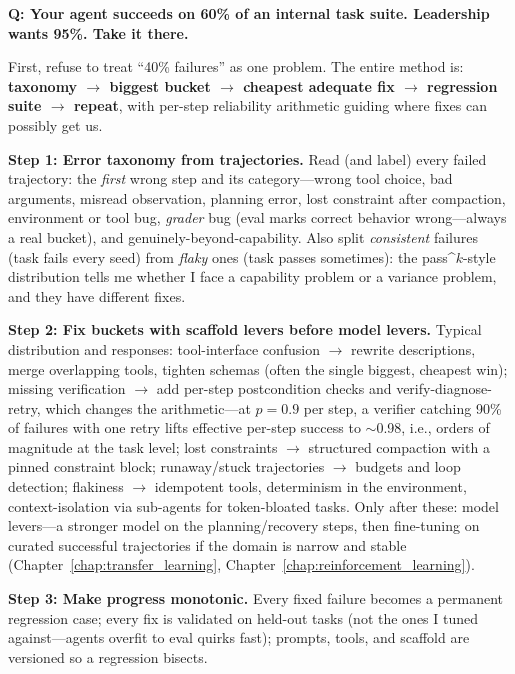 \begin{interviewq}
\textbf{Q: Your agent succeeds on 60\% of an internal task suite. Leadership wants 95\%. Take it there.}

 \quad {} \quad \badgefreq{\freqhigh}

\stronganswer

First, refuse to treat ``40\% failures'' as one problem. The entire method is: \textbf{taxonomy $\rightarrow$ biggest bucket $\rightarrow$ cheapest adequate fix $\rightarrow$ regression suite $\rightarrow$ repeat}, with per-step reliability arithmetic guiding where fixes can possibly get us.

\textbf{Step 1: Error taxonomy from trajectories.} Read (and label) every failed trajectory: the \textit{first} wrong step and its category---wrong tool choice, bad arguments, misread observation, planning error, lost constraint after compaction, environment or tool bug, \textit{grader} bug (eval marks correct behavior wrong---always a real bucket), and genuinely-beyond-capability. Also split \textit{consistent} failures (task fails every seed) from \textit{flaky} ones (task passes sometimes): the pass\textasciicircum{}$k$-style distribution tells me whether I face a capability problem or a variance problem, and they have different fixes.

\textbf{Step 2: Fix buckets with scaffold levers before model levers.} Typical distribution and responses: tool-interface confusion $\rightarrow$ rewrite descriptions, merge overlapping tools, tighten schemas (often the single biggest, cheapest win); missing verification $\rightarrow$ add per-step postcondition checks and verify-diagnose-retry, which changes the arithmetic---at $p=0.9$ per step, a verifier catching 90\% of failures with one retry lifts effective per-step success to $\sim$0.98, i.e., orders of magnitude at the task level; lost constraints $\rightarrow$ structured compaction with a pinned constraint block; runaway/stuck trajectories $\rightarrow$ budgets and loop detection; flakiness $\rightarrow$ idempotent tools, determinism in the environment, context-isolation via sub-agents for token-bloated tasks. Only after these: model levers---a stronger model on the planning/recovery steps, then fine-tuning on curated successful trajectories if the domain is narrow and stable (Chapter~\ref{chap:transfer_learning}, Chapter~\ref{chap:reinforcement_learning}).

\textbf{Step 3: Make progress monotonic.} Every fixed failure becomes a permanent regression case; every fix is validated on held-out tasks (not the ones I tuned against---agents overfit to eval quirks fast); prompts, tools, and scaffold are versioned so a regression bisects.


\end{interviewq}
